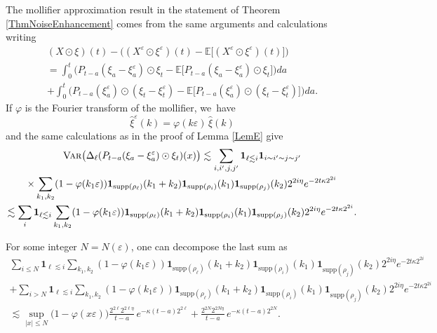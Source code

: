 \documentclass[JEP,XML,SOM,Unicode,published]{cedram}
\theoremstyle{definition}
\let\epsilon\varepsilon
\let\eps\epsilon
\newcommand\bbE{\mathbb{E}}
\newcommand{\bfone}{\mathbf{1}}
\begin{document}
The mollifier approximation result in the statement of Theorem \ref{ThmNoiseEnhancement} comes from the same arguments and calculations writing
\begin{multline*}
(X\odot\xi)(t) - \bigl((X^\eps\odot\xi^\eps)(t) - \bbE\bigl[(X^\eps\odot\xi^\eps)(t) \bigr]\bigr)
\\
= \int_0^t \bigl(P_{t-a}(\xi_a - \xi_a^{\eps})\odot \xi_t - \bbE\bigl[P_{t-a}(\xi_a - \xi_a^{\eps})\odot \xi_t\bigr]\bigr) da
\\
+ \int_0^t \bigl(P_{t-a}(\xi_a^\eps)\odot (\xi_t-\xi_t^\eps) - \bbE\bigl[P_{t-a}(\xi_a^\eps) \odot (\xi_t-\xi_t^\eps)\bigr]\bigr) da.
\end{multline*}
If $\varphi$ is the Fourier transform of the mollifier, we~have
\[
\widehat\xi^\eps(k)=\varphi(k\eps) \, \widehat{\xi}(k)
\]
and the same calculations as in the proof of Lemma \ref{LemE} give
\begin{multline*}
\textsc{{Var}}\bigl(\Delta_\ell(P_{t-a}(\xi_a - \xi_a^\eps)\odot\xi_t)(x)\bigr) \lesssim \sum_{i,i',j,j'} \bfone_{\ell\lesssim i}\bfone_{i\sim i' \sim j \sim j'}
\\
\times\sum_{k_1,k_2} (1-\varphi(k_1\eps))\bfone_{\text{supp}(\rho_\ell)}(k_1+k_2) \bfone_{\text{supp}(\rho_i)}(k_1)\bfone_{\text{supp}(\rho_j)}(k_2)2^{2 i \eta}e^{-2t\kappa 2^{2i}}
\\
\lesssim
\sum_{i} \bfone_{\ell\lesssim i} \sum_{k_1,k_2} (1-\varphi(k_1\eps))\bfone_{\text{supp}(\rho_\ell)}(k_1+k_2) \bfone_{\text{supp}(\rho_i)}(k_1)\bfone_{\text{supp}(\rho_j)}(k_2)2^{2 i \eta}e^{-2t\kappa 2^{2i}}.
\end{multline*}
\par\noindent
\begin{minipage}{\textwidth}
For some integer $N=N(\eps)$, one can decompose the last sum as
\begin{multline*}
\sum_{i\leq N} \bfone_{\ell\lesssim i} \sum_{k_1,k_2} (1-\varphi(k_1\eps))\bfone_{\text{supp}(\rho_\ell)}(k_1+k_2) \bfone_{\text{supp}(\rho_i)}(k_1)\bfone_{\text{supp}(\rho_j)}(k_2)2^{2 i \eta}e^{-2t\kappa 2^{2i}}
\\
+\sum_{i> N} \bfone_{\ell\lesssim i} \sum_{k_1,k_2} (1-\varphi(k_1\eps))\bfone_{\text{supp}(\rho_\ell)}(k_1+k_2) \bfone_{\text{supp}(\rho_i)}(k_1)\bfone_{\text{supp}(\rho_j)}(k_2)2^{2 i \eta}e^{-2t\kappa 2^{2i}}
\\
\lesssim \sup_{|x|\leq N}\bigl(1-\varphi(x\eps)\bigr) \frac{2^{2\ell}2^{2\ell\eta}}{t-a} \, e^{-\kappa(t-a)2^{2\ell}} + \frac{2^{2N}2^{2N\eta}}{t-a} \, e^{-\kappa(t-a)2^{2N}}.
\end{multline*}
\end{minipage}
\end{document}
